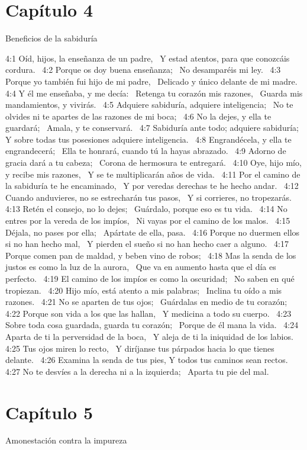 \section*{Capítulo 4 }
Beneficios de la sabiduría  

4:1 Oíd, hijos, la enseñanza de un padre,  
Y estad atentos, para que conozcáis cordura.  
4:2 Porque os doy buena enseñanza;  
No desamparéis mi ley.  
4:3 Porque yo también fui hijo de mi padre,  
Delicado y único delante de mi madre.  
4:4 Y él me enseñaba, y me decía:  
Retenga tu corazón mis razones,  
Guarda mis mandamientos, y vivirás.  
4:5 Adquiere sabiduría, adquiere inteligencia;  
No te olvides ni te apartes de las razones de mi boca;  
4:6 No la dejes, y ella te guardará;  
Amala, y te conservará.  
4:7 Sabiduría ante todo; adquiere sabiduría;  
Y sobre todas tus posesiones adquiere inteligencia.  
4:8 Engrandécela, y ella te engrandecerá;  
Ella te honrará, cuando tú la hayas abrazado.  
4:9 Adorno de gracia dará a tu cabeza;  
Corona de hermosura te entregará.  
4:10 Oye, hijo mío, y recibe mis razones,  
Y se te multiplicarán años de vida.  
4:11 Por el camino de la sabiduría te he encaminado,  
Y por veredas derechas te he hecho andar.  
4:12 Cuando anduvieres, no se estrecharán tus pasos,  
Y si corrieres, no tropezarás.  
4:13 Retén el consejo, no lo dejes;  
Guárdalo, porque eso es tu vida.  
4:14 No entres por la vereda de los impíos,  
Ni vayas por el camino de los malos.  
4:15 Déjala, no pases por ella;  
Apártate de ella, pasa.  
4:16 Porque no duermen ellos si no han hecho mal,  
Y pierden el sueño si no han hecho caer a alguno.  
4:17 Porque comen pan de maldad, y beben vino de robos;  
4:18 Mas la senda de los justos es como la luz de la aurora,  
Que va en aumento hasta que el día es perfecto.  
4:19 El camino de los impíos es como la oscuridad;  
No saben en qué tropiezan.  
4:20 Hijo mío, está atento a mis palabras;  
Inclina tu oído a mis razones.  
4:21 No se aparten de tus ojos;  
Guárdalas en medio de tu corazón;  
4:22 Porque son vida a los que las hallan,  
Y medicina a todo su cuerpo.  
4:23 Sobre toda cosa guardada, guarda tu corazón;  
Porque de él mana la vida.  
4:24 Aparta de ti la perversidad de la boca,  
Y aleja de ti la iniquidad de los labios.  
4:25 Tus ojos miren lo recto,  
Y diríjanse tus párpados hacia lo que tienes delante.  
4:26 Examina la senda de tus pies, 
Y todos tus caminos sean rectos.  
4:27 No te desvíes a la derecha ni a la izquierda;  
Aparta tu pie del mal.  
\section*{Capítulo 5 }
Amonestación contra la impureza  

